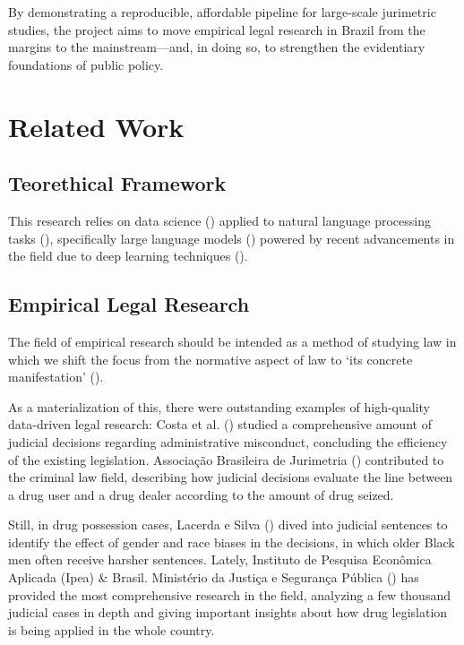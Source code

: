 \documentclass[
  12pt,
]{article}
\begin{document}
By demonstrating a reproducible, affordable pipeline for large-scale
jurimetric studies, the project aims to move empirical legal research in
Brazil from the margins to the mainstream---and, in doing so, to
strengthen the evidentiary foundations of public policy.

\section{Related Work}\label{related-work}

\subsection{Teorethical Framework}\label{sec-teorethical-framework}

This research relies on data science
() applied to natural
language processing tasks (), specifically large language models
() powered by recent
advancements in the field due to deep learning techniques
().

\subsection{Empirical Legal Research}\label{empirical-legal-research}

The field of empirical research should be intended as a method of
studying law in which we shift the focus from the normative aspect of
law to `its concrete manifestation'
().

As a materialization of this, there were outstanding examples of
high-quality data-driven legal research: Costa et al.
() studied a comprehensive
amount of judicial decisions regarding administrative misconduct,
concluding the efficiency of the existing legislation. Associação
Brasileira de Jurimetria
()
contributed to the criminal law field, describing how judicial decisions
evaluate the line between a drug user and a drug dealer according to the
amount of drug seized.

Still, in drug possession cases, Lacerda e Silva
() dived into judicial
sentences to identify the effect of gender and race biases in the
decisions, in which older Black men often receive harsher sentences.
Lately, Instituto de Pesquisa Econômica Aplicada (Ipea) \& Brasil.
Ministério da Justiça e Segurança Pública
()
has provided the most comprehensive research in the field, analyzing a
few thousand judicial cases in depth and giving important insights about
how drug legislation is being applied in the whole country.
\end{document}
